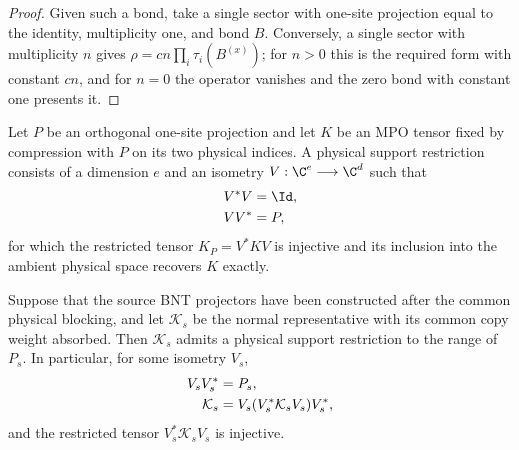 \begin{proof}\leanok
    Given such a bond, take a single sector with one-site projection equal to
    the identity, multiplicity one, and bond $B$. Conversely, a single sector
    with multiplicity $n$ gives $\rho=cn\prod_i\tau_i(B^{(x)})$; for $n>0$ this
    is the required form with constant $cn$, and for $n=0$ the operator vanishes
    and the zero bond with constant one presents it.
\end{proof}

\begin{definition}
    \label{def:mpdo_physical_support_restriction}
    \leanok
    Let $P$ be an orthogonal one-site projection and let $K$ be an MPO tensor
    fixed by compression with $P$ on its two physical indices. A physical
    support restriction consists of a dimension $e$ and an isometry
    $V:\C^e\longrightarrow\C^d$ such that
    \begin{align}
        V^*V & =\Id,
        \notag       \\
        VV^* & =P,
        \notag
    \end{align}
    for which the restricted tensor $K_P=V^*KV$ is injective and its
    inclusion into the ambient physical space recovers $K$ exactly.
\end{definition}

\begin{lemma}
    \label{thm:mpdo_bnt_physical_support_restriction}
    \leanok
    Suppose that the source BNT projectors have been constructed after the
    common physical blocking, and let $\mathcal K_s$ be the normal
    representative with its common copy weight absorbed. Then
    $\mathcal K_s$ admits a physical support restriction to the range of
    $P_s$. In particular, for some isometry $V_s$,
    \begin{align}
        V_sV_s^* & =P_s,
        \notag                                      \\
        \mathcal K_s
                 & =V_s(V_s^*\mathcal K_sV_s)V_s^*,
        \notag
    \end{align}
    and the restricted tensor $V_s^*\mathcal K_sV_s$ is injective.
\end{lemma}

